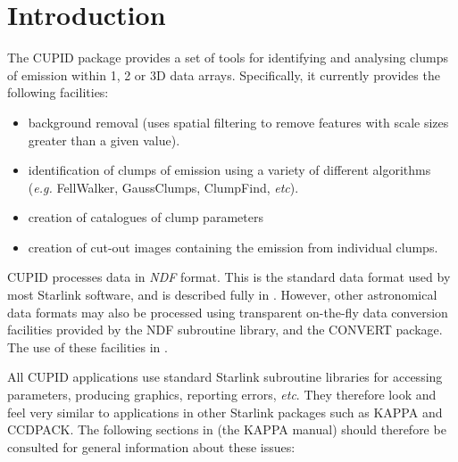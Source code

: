 \documentclass[twoside,11pt]{starlink}
\begin{document}
\scfrontmatter





\stardocabstract


\cleardoublepage


\section{Introduction}

The CUPID package provides a set of tools for identifying and analysing
clumps of emission within 1, 2 or 3D data arrays. Specifically, it currently
provides the following facilities:

\begin{itemize}
\item background removal (uses spatial filtering to remove features with
      scale sizes greater than a given value).
\item identification of clumps of emission using a variety of different
      algorithms (\emph{e.g.} FellWalker, GaussClumps, ClumpFind, \emph{etc}).
\item creation of catalogues of clump parameters
\item creation of cut-out images containing the emission from individual clumps.
\end{itemize}

CUPID processes data in \emph{NDF} format. This is the standard data
format used by most Starlink software, and is described fully in
. However, other astronomical data formats may also
be processed using transparent on-the-fly data conversion facilities
provided by the NDF subroutine library, and the CONVERT package. The use of
these facilities in .

All CUPID applications use standard Starlink subroutine libraries for
accessing parameters, producing graphics, reporting errors, \emph{etc}. They
therefore look and feel very similar to applications in other Starlink
packages such as KAPPA and CCDPACK. The following sections in
 (the KAPPA manual) should therefore be consulted for
general information about these issues:
\end{document}
